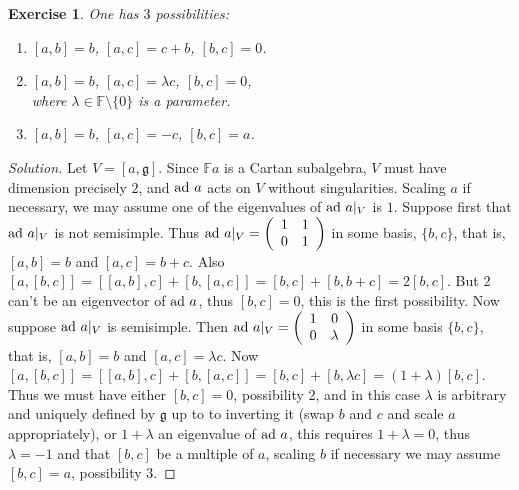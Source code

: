 \documentclass[12pt, fullpage]{article}
\newtheorem{exercise}{Exercise}[section]
\newcommand{\g}{\mathfrak{g}}
\newcommand{\ad}{{\rm ad\ }}
\newcommand{\F}{\mathbb{F}}
\begin{document}
\begin{description}
\begin{exercise}
One has $3$ possibilities:
\begin{enumerate}
\item $[a,b]=b$,  $[a,c]=c+b$,  $[b,c]=0$.
\item $[a,b]=b$,  $[a,c]=\lambda c$,  $[b,c]=0$,\\
where $\lambda\in\F\setminus\{0\}$ is a parameter.
\item $[a,b]=b$,  $[a,c]=-c$,  $[b,c]=a$.
\end{enumerate}
\end{exercise}
\begin{proof}[Solution]
Let $V=[a,\g]$.  Since $\F a$ is a Cartan subalgebra, $V$ must have
dimension precisely $2$, and $\ad a$ acts on $V$ without singularities.
Scaling $a$ if necessary, we may assume one of the eigenvalues of $\ad
a|_V$ is $1$.  Suppose first that $\ad a|_V$ is not semisimple.  Thus
$\ad a|_V= \left( \begin{array}{ccc} 1 & 1 \\ 0 & 1 \end{array}
\right)$ in some basis, $\{b,c\}$, that is, $[a,b]=b$ and $[a,c]=b+c$.
Also $[a,[b,c]]= [[a,b],c]+[b,[a,c]]= [b,c]+[b,b+c]= 2[b,c]$.  But $2$
can't be an eigenvector of $\ad a$, thus $[b,c]=0$, this is the first
possibility.  Now suppose $\ad a|_V$ is semisimple.  Then $\ad a|_V=
\left( \begin{array}{ccc} 1 & 0 \\ 0 & \lambda \end{array} \right)$ in
some basis $\{b,c\}$, that is, $[a,b]=b$ and $[a,c]=\lambda c$.  Now
$[a,[b,c]]= [[a,b],c]+[b,[a,c]]= [b,c]+[b,\lambda c]=
(1+\lambda)[b,c]$.  Thus we must have either $[b,c]=0$, possibility 2,
and in this case $\lambda$ is arbitrary and uniquely defined by $\g$
up to to inverting it (swap $b$ and $c$ and scale $a$ appropriately),
or $1+\lambda$ an eigenvalue of $\ad a$, this requires $1+\lambda=0$,
thus $\lambda=-1$ and that $[b,c]$ be a multiple of $a$, scaling $b$
if necessary we may assume $[b,c]=a$, possibility 3.
\end{proof}

\end{description}
\end{document}
